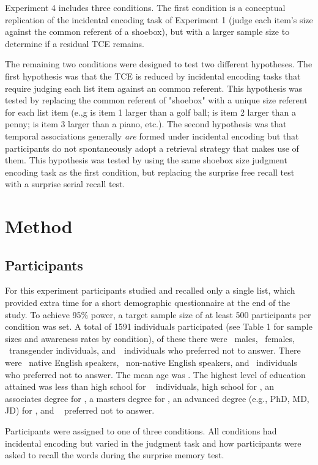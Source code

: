 \documentclass[man,natbib,floatsintext]{apa6} %
\begin{document}
Experiment 4 includes three conditions. The first condition is a conceptual replication of the incidental encoding task of Experiment 1 (judge each item's size against the common referent of a shoebox), but with a larger sample size to determine if a residual TCE remains. 

The remaining two conditions were designed to test two different hypotheses.
The first hypothesis was that the TCE is reduced by incidental encoding tasks that require judging each list item against an common referent. This hypothesis was tested by replacing the common referent of "shoebox" with a unique size referent for each list item (e.,g is item 1 larger than a golf ball; is item 2 larger than a penny; is item 3 larger than a piano, etc.). The second hypothesis was that temporal associations generally \emph{are} formed under incidental encoding but that participants do not spontaneously adopt a retrieval strategy that makes use of them. This hypothesis was tested by using the same shoebox size judgment encoding task as the first condition, but replacing the surprise free recall test with a surprise serial recall test. 

\section{Method}
\label{TODO-8}
\subsection{Participants}
For this experiment participants studied and recalled only a single list, which provided extra time for a short demographic questionnaire at the end of the study. To achieve 95\% power, a target sample size of at least 500 participants per condition was set. A total of 1591 individuals participated (see Table 1 for sample sizes and awareness rates by condition), of these there were \males~males, \females~females, \others~transgender individuals, and~\notans~individuals who preferred not to answer. There were \engY~native English speakers, \engN~non-native English speakers, and \engS~individuals who preferred not to answer.  The mean age was \age. The highest level of education attained was less than high school for \noed~ individuals, high school for \hschool, an associates degree for \ass, a masters degree for \mas, an advanced degree (e.g., PhD, MD, JD) for \phd, and \notansed~ preferred not to answer.

Participants were assigned to one of three conditions. All conditions had incidental encoding but varied in the judgment task and how participants were asked to recall the words during the surprise memory test.
\end{document}
